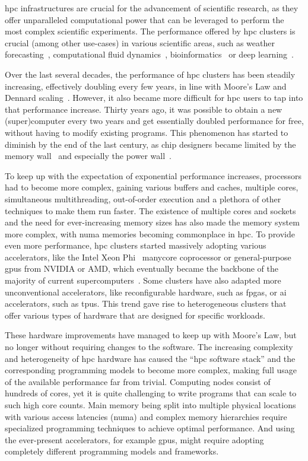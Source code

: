 \gls{hpc} infrastructures are crucial for the advancement of scientific
research, as they offer unparalleled computational power that can be leveraged to perform the most
complex scientific experiments. The performance offered by \gls{hpc} clusters is
crucial (among other use-cases) in various scientific areas, such as weather
forecasting~\cite{wrf}, computational fluid dynamics~\cite{cfd},
bioinformatics~\cite{bioinformatics} or deep learning~\cite{hpcdl}.

Over the last several decades, the performance of \gls{hpc} clusters has been steadily
increasing, effectively doubling every few years, in line with Moore's Law and Dennard
scaling~\cite{mooreslaw}. However, it also became more difficult for \gls{hpc}
users to tap into that performance increase. Thirty years ago, it was possible to obtain a new
(super)computer every two years and get essentially doubled performance for free, without having to
modify existing programs. This phenomenon has started to diminish by the end of the last century,
as chip designers became limited by the memory wall~\cite{memorywall} and especially the power
wall~\cite{powerwall}.

To keep up with the expectation of exponential performance increases, processors had to become more
complex, gaining various buffers and caches, multiple cores, simultaneous multithreading,
out-of-order execution and a plethora of other techniques to make them run faster. The existence of
multiple cores and sockets and the need for ever-increasing memory sizes has also made the memory
system more complex, with \gls{numa} memories becoming commonplace in
\gls{hpc}. To provide even more performance, \gls{hpc} clusters started
massively adopting various accelerators, like the Intel Xeon Phi~\cite{xeonphi} manycore
coprocessor or general-purpose \glspl{gpu} from NVIDIA or AMD, which eventually became
the backbone of the majority of current supercomputers~\cite{top500gpu}. Some clusters have
also adapted more unconventional accelerators, like reconfigurable hardware, such as
\glspl{fpga}, or \gls{ai} accelerators, such as \glspl{tpu}.
This trend gave rise to heterogeneous clusters that offer various types of hardware that are
designed for specific workloads.

These hardware improvements have managed to keep up with Moore's Law, but no longer without
requiring changes to the software. The increasing complexity and heterogeneity of
\gls{hpc} hardware has caused the ``\gls{hpc} software stack'' and the
corresponding programming models to become more complex, making full usage of the available
performance far from trivial. Computing nodes consist of hundreds of cores, yet it is quite
challenging to write programs that can scale to such high core counts. Main memory being split into
multiple physical locations with various access latencies (\gls{numa}) and complex
memory hierarchies require specialized programming techniques to achieve optimal performance. And
using the ever-present accelerators, for example \glspl{gpu}, might require adopting
completely different programming models and frameworks.

